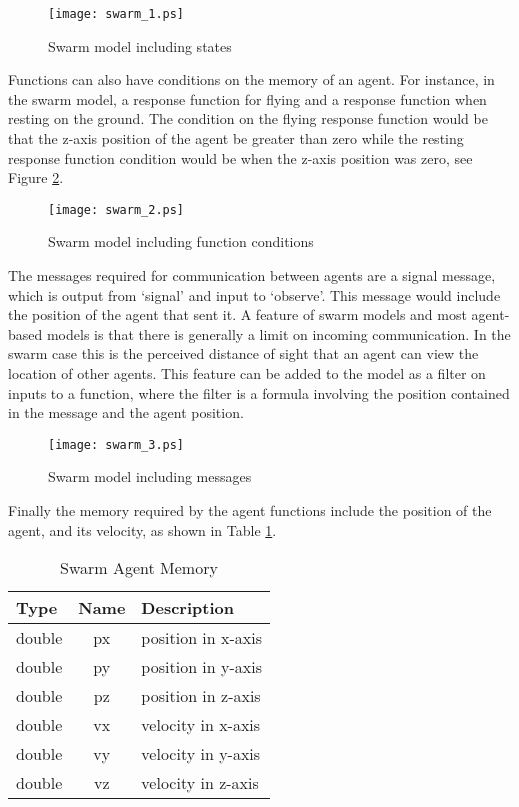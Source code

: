 \begin{figure}[ht]
\begin{center}
\texttt{[image: swarm\_1.ps]}
\caption{Swarm model including states}
\label{fig:swarm_1}
\end{center}
\end{figure}

Functions can also have conditions on the memory of an agent. For instance, in
the swarm model, a response function for flying and a response function when
resting on the ground. The condition on the flying response function would be that the
z-axis position of the agent be greater than zero while the resting response
function condition would be when the z-axis position was zero, see Figure
\ref{fig:swarm_2}.

\begin{figure}[ht]
\begin{center}
\texttt{[image: swarm\_2.ps]}
\caption{Swarm model including function conditions}
\label{fig:swarm_2}
\end{center}
\end{figure}

The messages required for communication between agents are a signal message,
which is output from `signal' and input to `observe'. This message would include
the position of the agent that sent it. A feature of swarm models and most agent-based models is that
there is generally a limit on incoming communication. In the swarm case this is
the perceived distance of sight that an agent can view the location of other
agents. This feature can be added to the model as a filter on inputs to a
function, where the filter is a formula involving the position contained in the
message and the agent position.

\begin{figure}[ht]
\begin{center}
\texttt{[image: swarm\_3.ps]}
\caption{Swarm model including messages}
\label{fig:swarm_3}
\end{center}
\end{figure}

Finally the memory required by the agent functions include the position of the
agent, and its velocity, as shown in Table \ref{tab:swarm_memory}.

\begin{table}[ht]
\centering
\begin{tabular}{|l||c||l|}
\hline
Type&Name&Description\\
\hline \hline
double&px&position in x-axis\\
\hline
double&py&position in y-axis\\
\hline
double&pz&position in z-axis\\
\hline
double&vx&velocity in x-axis\\
\hline
double&vy&velocity in y-axis\\
\hline
double&vz&velocity in z-axis\\
\hline
\end{tabular}
\caption{Swarm Agent Memory}
\label{tab:swarm_memory}
\end{table}

